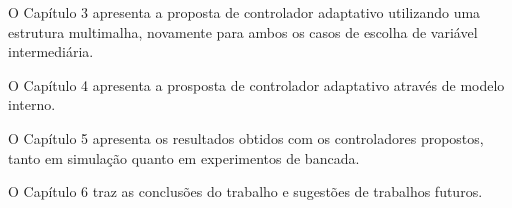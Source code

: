 	O Capítulo 3 apresenta a proposta de controlador adaptativo utilizando uma
	estrutura multimalha, novamente para ambos os casos de escolha de variável
	intermediária.

	O Capítulo 4 apresenta a prosposta de controlador adaptativo através de
	modelo interno.

	O Capítulo 5 apresenta os resultados obtidos com os controladores propostos,
	tanto em simulação quanto em experimentos de bancada.

	O Capítulo 6 traz as conclusões do trabalho e sugestões de trabalhos futuros.

